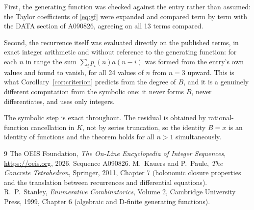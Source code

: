 \documentclass[11pt,a4paper]{article}
\theoremstyle{plain}
\theoremstyle{definition}
\begin{document}
First, the generating function was checked against the entry rather than assumed: the
Taylor coefficients of \eqref{eq:gf} were expanded and compared term by term with the DATA
section of A090826, agreeing on all 13 terms compared.

Second, the recurrence itself was evaluated directly on the published terms, in exact
integer arithmetic and without reference to the generating function: for each $n$ in range
the sum $\sum_{i}p_{i}(n)a(n-i)$ was formed from the entry's own values and found to
vanish, for all 24 values of $n$ from $n=3$ upward. This is what
Corollary~\ref{cor:criterion} predicts from the degree of $B$, and it is a genuinely
different computation from the symbolic one: it never forms $B$, never differentiates, and
uses only integers.

The symbolic step is exact throughout. The residual is obtained by rational-function
cancellation in $K$, not by series truncation, so the identity $B=x$ is an
identity of functions and the theorem holds for all $n>1$ simultaneously.

\begin{thebibliography}{9}
 The OEIS Foundation, \emph{The On-Line Encyclopedia of Integer Sequences},
\url{https://oeis.org}, 2026. Sequence A090826.
 M.~Kauers and P.~Paule, \emph{The Concrete Tetrahedron}, Springer, 2011,
Chapter 7 (holonomic closure properties and the translation between recurrences and
differential equations).
 R.~P.~Stanley, \emph{Enumerative Combinatorics}, Volume 2, Cambridge
University Press, 1999, Chapter 6 (algebraic and D-finite generating functions).
\end{thebibliography}
\end{document}
